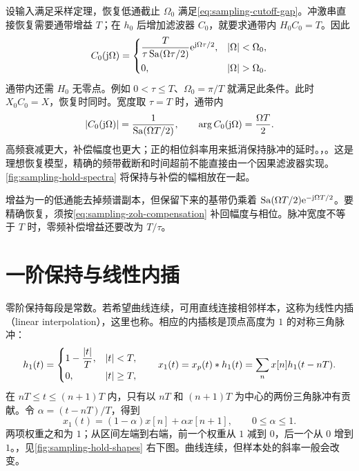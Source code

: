 设输入满足采样定理，恢复低通截止 $\Omega_0$ 满足\cref{eq:sampling-cutoff-gap}。冲激串直接恢复需要通带增益 $T$；在 $h_0$ 后增加滤波器 $C_0$，就要求通带内 $H_0C_0=T$。因此
\begin{equation}
  C_0(\iu\Omega)=
  \begin{cases}
    \dfrac{T}{\tau\Sa(\Omega\tau/2)}
       \e^{\iu\Omega\tau/2},&|\Omega|<\Omega_0,\\[0.7em]
    0,&|\Omega|>\Omega_0.
  \end{cases}
  \label{eq:sampling-zoh-compensation}
\end{equation}
通带内还需 $H_0$ 无零点。例如 $0<\tau\le T$、$\Omega_0=\pi/T$ 就满足此条件。此时 $X_0C_0=X$，恢复时同时。宽度取 $\tau=T$ 时，通带内
\[
  |C_0(\mathrm{j}\Omega)|=\frac1{\operatorname{Sa}(\Omega T/2)},\qquad
  \arg C_0(\mathrm{j}\Omega)=\frac{\Omega T}{2}.
\]
高频衰减更大，补偿幅度也更大；正的相位斜率用来抵消保持脉冲的延时。，。这是理想恢复模型，精确的频带截断和时间超前不能直接由一个因果滤波器实现。\cref{fig:sampling-hold-spectra} 将保持与补偿的幅相放在一起。

\begin{pitfall}[保持后只接增益为一的理想低通]
  增益为一的低通能去掉频谱副本，但保留下来的基带仍乘着 $\operatorname{Sa}(\Omega T/2)\mathrm{e}^{-\mathrm{j}\Omega T/2}$。要精确恢复，须按\cref{eq:sampling-zoh-compensation} 补回幅度与相位。脉冲宽度不等于 $T$ 时，零频补偿增益还要改为 $T/\tau$。
\end{pitfall}

\section{一阶保持与线性内插}
\label{sec:sampling-first-order-hold}

零阶保持每段是常数。若希望曲线连续，可用直线连接相邻样本，这称为线性内插（linear interpolation），这里也称。相应的内插核是顶点高度为 $1$ 的对称三角脉冲：
\begin{equation}
  h_1(t)=
  \begin{cases}
    1-\dfrac{|t|}{T},&|t|<T,\\[0.4em]
    0,&|t|\ge T,
  \end{cases}
  \qquad
  x_1(t)=x_p(t)\mathbin{\ast} h_1(t)
        =\sum_n x[n]h_1(t-nT).
  \label{eq:sampling-foh}
\end{equation}
在 $nT\le t\le(n+1)T$ 内，只有以 $nT$ 和 $(n+1)T$ 为中心的两份三角脉冲有贡献。令 $\alpha=(t-nT)/T$，得到
\begin{equation}
  x_1(t)=(1-\alpha)x[n]+\alpha x[n+1],
  \qquad 0\le\alpha\le1.
  \label{eq:sampling-linear-interpolation}
\end{equation}
两项权重之和为 $1$；从区间左端到右端，前一个权重从 $1$ 减到 $0$，后一个从 $0$ 增到 $1$。，见\cref{fig:sampling-hold-shapes} 右下图。曲线连续，但样本处的斜率一般会改变。

